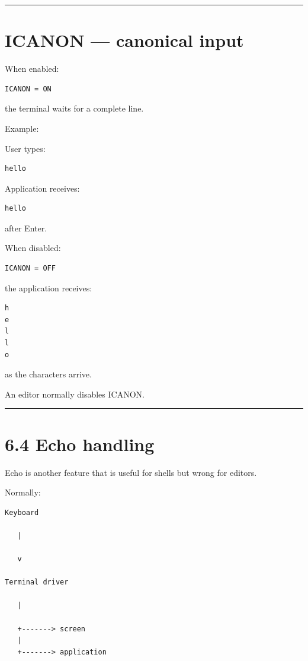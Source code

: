\documentclass[
  oneside,
  openany]{book}
\begin{document}
\begin{center}\rule{0.5\linewidth}{0.5pt}\end{center}

\hypertarget{icanon-canonical-input}{%
\section{ICANON --- canonical input}\label{icanon-canonical-input}}

When enabled:

\begin{verbatim}
ICANON = ON
\end{verbatim}

the terminal waits for a complete line.

Example:

User types:

\begin{verbatim}
hello
\end{verbatim}

Application receives:

\begin{verbatim}
hello
\end{verbatim}

after Enter.

When disabled:

\begin{verbatim}
ICANON = OFF
\end{verbatim}

the application receives:

\begin{verbatim}
h
e
l
l
o
\end{verbatim}

as the characters arrive.

An editor normally disables ICANON.

\begin{center}\rule{0.5\linewidth}{0.5pt}\end{center}

\hypertarget{echo-handling}{%
\section{6.4 Echo handling}\label{echo-handling}}

Echo is another feature that is useful for shells but wrong for editors.

Normally:

\begin{verbatim}
Keyboard

   |

   v

Terminal driver

   |

   +-------> screen
   |
   +-------> application
\end{verbatim}
\end{document}
